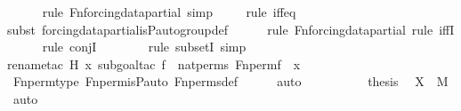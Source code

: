 \begin{isabellebody}
\ \ \ \ \ \isamarkupfalse%
{\isacharparenleft}{\kern0pt}rule\ Fn{\isacharunderscore}{\kern0pt}forcing{\isacharunderscore}{\kern0pt}data{\isacharunderscore}{\kern0pt}partial{\isacharcomma}{\kern0pt}\ simp{\isacharparenright}{\kern0pt}\isanewline
\ \ \ \ \isamarkupfalse%
{\isacharparenleft}{\kern0pt}rule\ iff{\isacharunderscore}{\kern0pt}eq{\isacharparenright}{\kern0pt}\isanewline
\ \ \ \ \isamarkupfalse%
{\isacharparenleft}{\kern0pt}subst\ forcing{\isacharunderscore}{\kern0pt}data{\isacharunderscore}{\kern0pt}partial{\isachardot}{\kern0pt}is{\isacharunderscore}{\kern0pt}P{\isacharunderscore}{\kern0pt}auto{\isacharunderscore}{\kern0pt}group{\isacharunderscore}{\kern0pt}def{\isacharparenright}{\kern0pt}\isanewline
\ \ \ \ \ \isamarkupfalse%
{\isacharparenleft}{\kern0pt}rule\ Fn{\isacharunderscore}{\kern0pt}forcing{\isacharunderscore}{\kern0pt}data{\isacharunderscore}{\kern0pt}partial{\isacharcomma}{\kern0pt}\ rule\ iffI{\isacharparenright}{\kern0pt}\isanewline
\ \ \ \ \ \isamarkupfalse%
{\isacharparenleft}{\kern0pt}rule\ conjI{\isacharparenright}{\kern0pt}{\isacharplus}{\kern0pt}\isanewline
\ \ \ \ \ \ \ \isamarkupfalse%
{\isacharparenleft}{\kern0pt}rule\ subsetI{\isacharcomma}{\kern0pt}\ simp{\isacharparenright}{\kern0pt}\isanewline
\ \ \ \ \ \ \ \isamarkupfalse%
{\isacharparenleft}{\kern0pt}rename{\isacharunderscore}{\kern0pt}tac\ H\ x{\isacharcomma}{\kern0pt}\ subgoal{\isacharunderscore}{\kern0pt}tac\ {\isachardoublequoteopen}{\isasymexists}f\ {\isasymin}\ nat{\isacharunderscore}{\kern0pt}perms{\isachardot}{\kern0pt}\ Fn{\isacharunderscore}{\kern0pt}perm{\isacharprime}{\kern0pt}{\isacharparenleft}{\kern0pt}f{\isacharparenright}{\kern0pt}\ {\isacharequal}{\kern0pt}\ x{\isachardoublequoteclose}{\isacharparenright}{\kern0pt}\isanewline
\ \ \ \ \isamarkupfalse%
\ Fn{\isacharunderscore}{\kern0pt}perm{\isacharprime}{\kern0pt}{\isacharunderscore}{\kern0pt}type\ Fn{\isacharunderscore}{\kern0pt}perm{\isacharprime}{\kern0pt}{\isacharunderscore}{\kern0pt}is{\isacharunderscore}{\kern0pt}P{\isacharunderscore}{\kern0pt}auto\ Fn{\isacharunderscore}{\kern0pt}perms{\isacharunderscore}{\kern0pt}def\isanewline
\ \ \ \ \isamarkupfalse%
\ auto\isanewline
\ \ \ \ \isanewline
\ \ \isamarkupfalse%
\ \isamarkupfalse%
\ {\isacharquery}{\kern0pt}thesis\ \isamarkupfalse%
\ {\isacartoucheopen}X\ {\isasymin}\ M{\isacartoucheclose}\ \isamarkupfalse%
\ auto\isanewline

\end{isabellebody}
